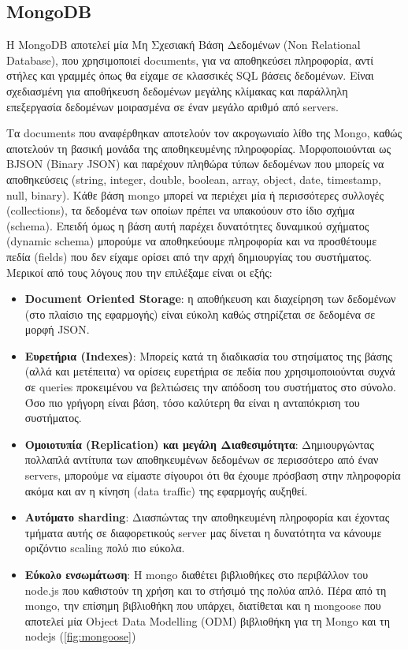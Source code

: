 \subsection{MongoDB}
\label{subsec:mongodb}

H MongoDB αποτελεί μία Μη Σχεσιακή Βάση Δεδομένων (Non Relational Database), που χρησιμοποιεί documents,
για να αποθηκεύσει πληροφορία, αντί στήλες και γραμμές όπως θα είχαμε σε κλασσικές SQL βάσεις δεδομένων.
Είναι σχεδιασμένη για αποθήκευση δεδομένων μεγάλης κλίμακας και παράλληλη επεξεργασία δεδομένων μοιρασμένα
σε έναν μεγάλο αριθμό από servers. 

Τα documents που αναφέρθηκαν αποτελούν τον ακρογωνιαίο λίθο της Mongo, καθώς αποτελούν τη βασική μονάδα
της αποθηκευμένης πληροφορίας. Μορφοποιούνται ως BJSON (Binary JSON) και παρέχουν πληθώρα τύπων δεδομένων
που μπορείς να αποθηκεύσεις (string, integer, double, boolean, array, object, date, timestamp, null, binary). Κάθε βάση mongo μπορεί να περιέχει μία ή περισσότερες συλλογές (collections),
τα δεδομένα των οποίων πρέπει να υπακούουν στο ίδιο σχήμα (schema). Επειδή όμως η βάση αυτή παρέχει
δυνατότητες δυναμικού σχήματος (dynamic schema) μπορούμε να αποθηκεύουμε πληροφορία και να προσθέτουμε πεδία (fields)
που δεν είχαμε ορίσει από την αρχή δημιουργίας του συστήματος. \\

Μερικοί από τους λόγους που την επιλέξαμε είναι οι εξής:

\begin{itemize}
	\item \textbf{Document Oriented Storage}: η αποθήκευση και διαχείρηση των δεδομένων
		(στο πλαίσιο της εφαρμογής) είναι εύκολη καθώς στηρίζεται σε δεδομένα σε μορφή JSON.
	\item \textbf{Ευρετήρια (Indexes)}: Μπορείς κατά τη διαδικασία του στησίματος της βάσης (αλλά και μετέπειτα)
		να ορίσεις ευρετήρια σε πεδία που χρησιμοποιούνται συχνά σε queries προκειμένου
		να βελτιώσεις την απόδοση του συστήματος στο σύνολο. Όσο πιο γρήγορη είναι βάση, τόσο
		καλύτερη θα είναι η ανταπόκριση του συστήματος. 
	\item \textbf{Ομοιοτυπία (Replication) και μεγάλη Διαθεσιμότητα}: Δημιουργώντας πολλαπλά αντίτυπα των αποθηκευμένων δεδομένων	
		σε περισσότερο από έναν servers, μπορούμε να είμαστε σίγουροι ότι θα έχουμε πρόσβαση στην
		πληροφορία ακόμα και αν η κίνηση (data traffic) της εφαρμογής αυξηθεί.
	\item \textbf{Αυτόματο sharding}: Διασπώντας την αποθηκευμένη πληροφορία και έχοντας τμήματα αυτής σε διαφορετικούς server
		μας δίνεται η δυνατότητα να κάνουμε οριζόντιο scaling πολύ πιο εύκολα. 
	\item \textbf{Εύκολο ενσωμάτωση}: Η mongo διαθέτει βιβλιοθήκες στο περιβάλλον του node.js που καθιστούν
		τη χρήση και το στήσιμό της πολύα απλό. Πέρα από τη mongo, την επίσημη βιβλιοθήκη που υπάρχει,
		διατίθεται και η mongoose που αποτελεί μία Object Data Modelling (ODM) βιβλιοθήκη για τη Mongo και τη nodejs (\autoref{fig:mongoose}) 
\end{itemize}

